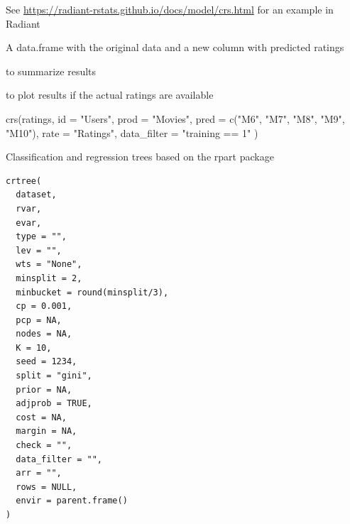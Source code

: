 \documentclass[a4paper]{book}
\begin{document}
%
\begin{Details}
See \url{https://radiant-rstats.github.io/docs/model/crs.html} for an example in Radiant
\end{Details}
%
\begin{Value}
A data.frame with the original data and a new column with predicted ratings
\end{Value}
%
\begin{SeeAlso}
 to summarize results

 to plot results if the actual ratings are available
\end{SeeAlso}
%
\begin{Examples}
\begin{ExampleCode}
crs(ratings,
  id = "Users", prod = "Movies", pred = c("M6", "M7", "M8", "M9", "M10"),
  rate = "Ratings", data_filter = "training == 1"
) %
\end{ExampleCode}
\end{Examples}
%
\begin{Description}
Classification and regression trees based on the rpart package
\end{Description}
%
\begin{Usage}
\begin{verbatim}
crtree(
  dataset,
  rvar,
  evar,
  type = "",
  lev = "",
  wts = "None",
  minsplit = 2,
  minbucket = round(minsplit/3),
  cp = 0.001,
  pcp = NA,
  nodes = NA,
  K = 10,
  seed = 1234,
  split = "gini",
  prior = NA,
  adjprob = TRUE,
  cost = NA,
  margin = NA,
  check = "",
  data_filter = "",
  arr = "",
  rows = NULL,
  envir = parent.frame()
)
\end{verbatim}
\end{Usage}
%
\end{document}
